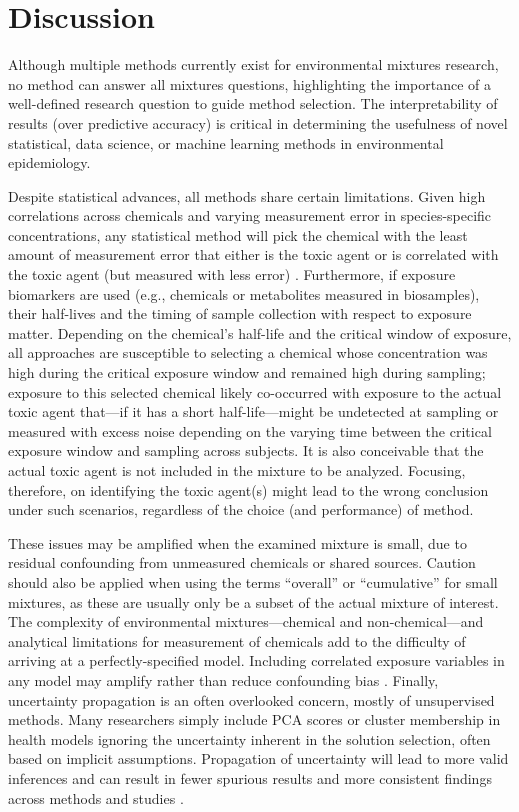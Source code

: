\section{Discussion}\label{sec:Discuss}

Although multiple methods currently exist for environmental mixtures research, no method can answer all mixtures questions, highlighting the importance of a well-defined research question to guide method selection. The interpretability of results (over predictive accuracy) is critical in determining the usefulness of novel statistical, data science, or machine learning methods in environmental epidemiology.

Despite statistical advances, all methods share certain limitations. Given high correlations across chemicals and varying measurement error in species-specific concentrations, any statistical method will pick the chemical with the least amount of measurement error that either is the toxic agent or is correlated with the toxic agent (but measured with less error) \cite{carroll2006measurement, pollack2012correlated}. Furthermore, if exposure biomarkers are used (e.g., chemicals or metabolites measured in biosamples), their half-lives and the timing of sample collection with respect to exposure matter. Depending on the chemical’s half-life and the critical window of exposure, all approaches are susceptible to selecting a chemical whose concentration was high during the critical exposure window and remained high during sampling; exposure to this selected chemical likely co-occurred with exposure to the actual toxic agent that---if it has a short half-life---might be undetected at sampling or measured with excess noise depending on the varying time between the critical exposure window and sampling across subjects. It is also conceivable that the actual toxic agent is not included in the mixture to be analyzed. Focusing, therefore, on identifying the toxic agent(s) might lead to the wrong conclusion under such scenarios, regardless of the choice (and performance) of method.

These issues may be amplified when the examined mixture is small, due to residual confounding from unmeasured chemicals or shared sources. Caution should also be applied when using the terms ``overall'' or ``cumulative'' for small mixtures, as these are usually only be a subset of the actual mixture of interest. The complexity of environmental mixtures---chemical and non-chemical---and analytical limitations for measurement of chemicals add to the difficulty of arriving at a perfectly-specified model. Including correlated exposure variables in any model may amplify rather than reduce confounding bias \cite{weisskopf2018bias}. Finally, uncertainty propagation is an often overlooked concern, mostly of unsupervised methods. Many researchers simply include PCA scores or cluster membership in health models ignoring the uncertainty inherent in the solution selection, often based on implicit assumptions. Propagation of uncertainty will lead to more valid inferences and can result in fewer spurious results and more consistent findings across methods and studies \cite{mak14_unc}.


